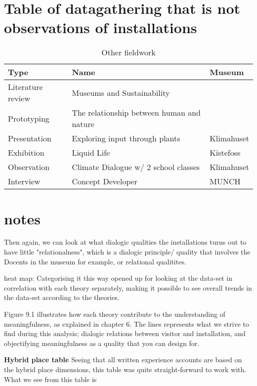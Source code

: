 \section{Table of datagathering that is not observations of installations}
\begin{table}[h]
\centering
\begin{tabular}{l | l| l}
\textbf{Type} & \textbf{Name} & \textbf{Museum}\\
\hline
Literature review & Museums and Sustainability & \\
Prototyping & The relationship between human and nature \\
Presentation & Exploring input through plants & Klimahuset\\
Exhibition & Liquid Life & Kistefoss \\
Observation & Climate Dialogue w/ 2 school classes & Klimahuset\\
Interview & Concept Developer & MUNCH\\
\end{tabular}
\caption{Other fieldwork}
\label{tab:abc}
\end{table}


\section{notes}

\par Then again, we can look at what dialogic qualities the installations turns out to have little "relationalness", which is a dialogic principle/ quality that involves the Docents in the museum for example, or relational qualitites.


heat map: Categorising it this way opened up for looking at the data-set in correlation with each theory separately, making it possible to see overall trends in the data-set according to the theories. 

Figure 9.1 illustrates how each theory contribute to the understanding of meaningfulness, as explained in chapter 6. The lines represents what we strive to find during this analysis; dialogic relations between visitor and installation, and objectifying meaningfulness as a quality that you can design for.



\textbf{Hybrid place table}
Seeing that all written experience accounts are based on the hybrid place dimensions, this table was quite straight-forward to work with. What we see from this table is 

